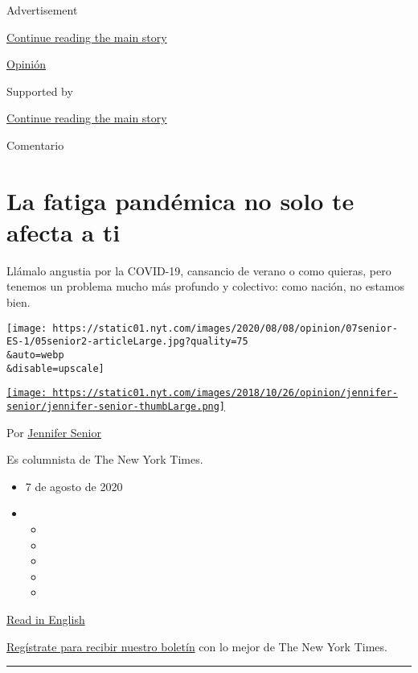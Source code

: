 Advertisement

\protect\hyperlink{after-top}{Continue reading the main story}

\href{/es/section/opinion}{Opinión}

Supported by

\protect\hyperlink{after-sponsor}{Continue reading the main story}

Comentario

\hypertarget{la-fatiga-panduxe9mica-no-solo-te-afecta-a-ti}{%
\section{La fatiga pandémica no solo te afecta a
ti}\label{la-fatiga-panduxe9mica-no-solo-te-afecta-a-ti}}

Llámalo angustia por la COVID-19, cansancio de verano o como quieras,
pero tenemos un problema mucho más profundo y colectivo: como nación, no
estamos bien.

\texttt{[image: https://static01.nyt.com/images/2020/08/08/opinion/07senior-ES-1/05senior2-articleLarge.jpg?quality=75\\\&auto=webp\\\&disable=upscale]}

\href{https://www.nytimes.com/by/jennifer-senior}{\texttt{[image: https://static01.nyt.com/images/2018/10/26/opinion/jennifer-senior/jennifer-senior-thumbLarge.png]}}

Por \href{https://www.nytimes.com/by/jennifer-senior}{Jennifer Senior}

Es columnista de The New York Times.

\begin{itemize}
\item
  7 de agosto de 2020
\item
  \begin{itemize}
  \item
  \item
  \item
  \item
  \item
  \end{itemize}
\end{itemize}

\href{https://www.nytimes.com/2020/08/05/opinion/coronavirus-mental-illness-depression.html}{Read
in English}

\href{https://www.nytimes.com/newsletters/el-times}{Regístrate para
recibir nuestro boletín} con lo mejor de The New York Times.

\begin{center}\rule{0.5\linewidth}{\linethickness}\end{center}

